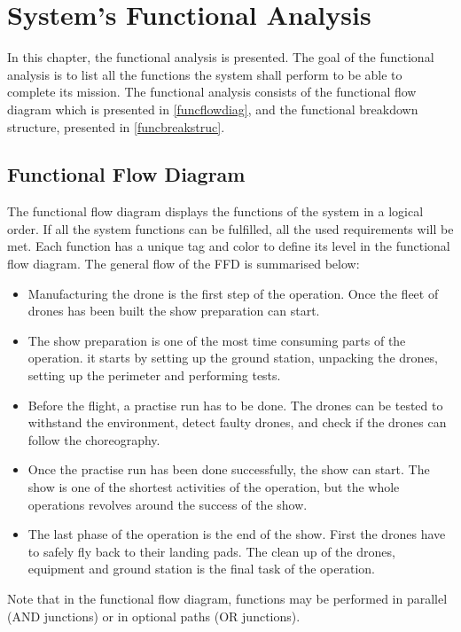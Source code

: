 \chapter{System's Functional Analysis}
\label{ch:functionalanalysis}
In this chapter, the functional analysis is presented. The goal of the functional analysis is to list all the functions the system shall perform to be able to complete its mission.  The functional analysis consists of the functional flow diagram which is presented in \autoref{funcflowdiag}, and the functional breakdown structure, presented in \autoref{funcbreakstruc}.

\section{Functional Flow Diagram}
\label{funcflowdiag}
The functional flow diagram displays the functions of the system in a logical order. If all the system functions can be fulfilled, all the used requirements will be met. Each function has a unique tag and color to define its level in the functional flow diagram. The general flow of the FFD is summarised below:

\begin{itemize}[noitemsep,nolistsep]
    \item Manufacturing the drone is the first step of the operation. Once the fleet of drones has been built the show preparation can start.
    \item The show preparation is one of the most time consuming parts of the operation. it starts by setting up the ground station, unpacking the drones, setting up the perimeter and performing tests. 
    \item Before the flight, a practise run has to be done. The drones can be tested to withstand the environment, detect faulty drones, and check if the drones can follow the choreography.
    \item Once the practise run has been done successfully, the show can start. The show is one of the shortest activities of the operation, but the whole operations revolves around the success of the show.
    \item The last phase of the operation is the end of the show. First the drones have to safely fly back to their landing pads. The clean up of the drones, equipment and ground station is the final task of the operation.   
\end{itemize}

Note that in the functional flow diagram, functions may be performed in parallel (AND junctions) or in optional paths (OR junctions).

